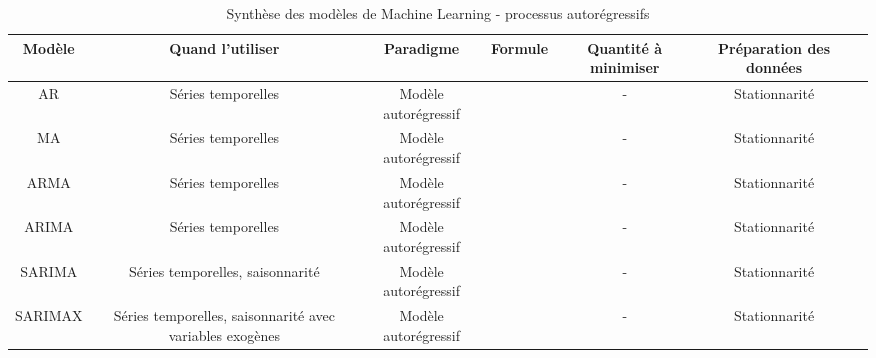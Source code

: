 \begin{table}[h!]
\scriptsize
\begin{tabularx}{\textwidth}{|C|C|C|C|C|C|C|}
\hline
\textbf{Modèle}      & \textbf{Quand l'utiliser}                                           & \textbf{Paradigme}                   & \textbf{Formule}                                                                & \textbf{Quantité à minimiser}         & \textbf{Préparation des données}  \\
\hline

AR                   & Séries temporelles                                                  & Modèle autorégressif                 &                                                                                 & -                                     & Stationnarité                      \\
\hline

MA                   & Séries temporelles                                                  & Modèle autorégressif                 &                                                                                 & -                                     & Stationnarité                      \\
\hline

ARMA                 & Séries temporelles                                                  & Modèle autorégressif                 &                                                                                 & -                                     & Stationnarité                      \\
\hline

ARIMA                & Séries temporelles                                                  & Modèle autorégressif                 &                                                                                 & -                                     & Stationnarité                      \\
\hline

SARIMA               & Séries temporelles, saisonnarité                                    & Modèle autorégressif                 &                                                                                 & -                                     & Stationnarité                      \\
\hline

SARIMAX              & Séries temporelles, saisonnarité avec variables exogènes            & Modèle autorégressif                 &                                                                                 & -                                     & Stationnarité                      \\
\hline


\end{tabularx}
\caption{Synthèse des modèles de Machine Learning - processus autorégressifs}
\end{table}

